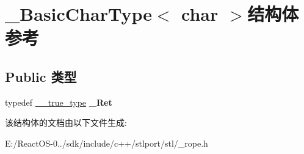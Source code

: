 \hypertarget{struct___basic_char_type_3_01char_01_4}{}\section{\+\_\+\+Basic\+Char\+Type$<$ char $>$结构体 参考}
\label{struct___basic_char_type_3_01char_01_4}
\subsection*{Public 类型}
\begin{DoxyCompactItemize}
\item 
\mbox{\label{struct___basic_char_type_3_01char_01_4_a760f9ead084900c021df55e3d3199826}} 
typedef \hyperlink{struct____true__type}{\+\_\+\+\_\+true\+\_\+type} {\bfseries \+\_\+\+Ret}
\end{DoxyCompactItemize}


该结构体的文档由以下文件生成\+:\begin{DoxyCompactItemize}
\item 
E\+:/\+React\+O\+S-\/0../sdk/include/c++/stlport/stl/\+\_\+rope.\+h\end{DoxyCompactItemize}
